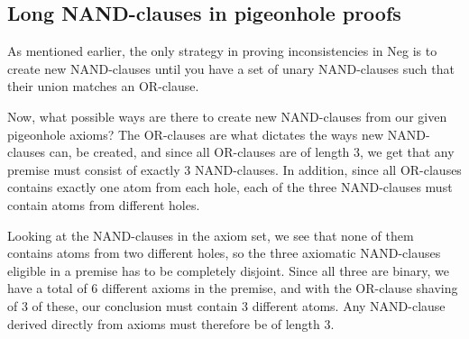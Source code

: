 \subsection{Long NAND-clauses in pigeonhole proofs}
\label{sub:Long NAND-clauses in pigeonhole proofs}
As mentioned earlier, the only strategy in proving inconsistencies in Neg is to create new NAND-clauses until you have a set of unary NAND-clauses such that their union matches an OR-clause.

Now, what possible ways are there to create new NAND-clauses from our given pigeonhole axioms?
The OR-clauses are what dictates the ways new NAND-clauses can, be created, and since all OR-clauses are of length 3, we get that any premise must consist of exactly 3 NAND-clauses.
In addition, since all OR-clauses contains exactly one atom from each hole, each of the three NAND-clauses must contain atoms from different holes.

Looking at the NAND-clauses in the axiom set, we see that none of them contains atoms from two different holes, so the three axiomatic NAND-clauses eligible in a premise has to be completely disjoint.
Since all three are binary, we have a total of 6 different axioms in the premise, and with the OR-clause shaving of 3 of these, our conclusion must contain 3 different atoms.
Any NAND-clause derived directly from axioms must therefore be of length 3.
